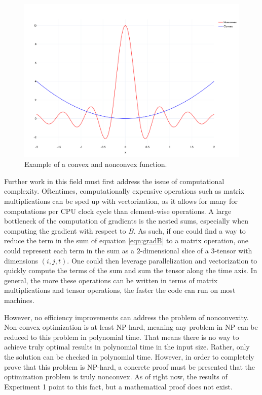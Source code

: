\documentclass[12pt]{article}
\theoremstyle{definition}
\begin{document}
\begin{figure}[hbt!]
    \par
    \begin{center}
    \caption{Example of a convex and nonconvex function.}
    \label{fig:convexityExample}
    \includegraphics[scale=0.16]{Figures/convexity_example.png}
    \end{center}
    \par
    \vspace{-0.25in}
    \medskip
\end{figure}

Further work in this field must first address the issue of computational complexity. Oftentimes, computationally expensive operations such as matrix multiplications can be sped up with vectorization, as it allows for many for computations per CPU clock cycle than element-wise operations. A large bottleneck of the computation of gradients is the nested sums, especially when computing the gradient with respect to $B$. As such, if one could find a way to reduce the term in the sum of equation \ref{eqn:gradB} to a matrix operation, one could represent each term in the sum as a $2$-dimensional slice of a $3$-tensor with dimensions $(i, j, t)$. One could then leverage parallelization and vectorization to quickly compute the terms of the sum and sum the tensor along the time axis. In general, the more these operations can be written in terms of matrix multiplications and tensor operations, the faster the code can run on most machines.

However, no efficiency improvements can address the problem of nonconvexity. Non-convex optimization is at least NP-hard, meaning any problem in NP can be reduced to this problem in polynomial time. That means there is no way to achieve truly optimal results in polynomial time in the input size. Rather, only the solution can be checked in polynomial time. However, in order to completely prove that this problem is NP-hard, a concrete proof must be presented that the optimization problem is truly nonconvex. As of right now, the results of Experiment 1 point to this fact, but a mathematical proof does not exist.
\end{document}
